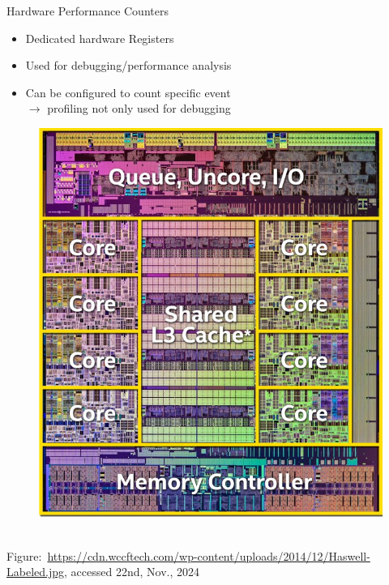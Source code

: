 \documentclass[aspectratio=169]{beamer}
\begin{document}
\begin{frame}{Hardware Performance Counters}
    \begin{minipage}{0.55\textwidth}
        \begin{itemize}
            \item Dedicated hardware Registers
            \item Used for debugging/performance analysis
            \item Can be configured to count specific event
                  \\ $\rightarrow$ profiling not only used for debugging
        \end{itemize}
    \end{minipage}
    \begin{minipage}{0.35\textwidth}
        \begin{figure}
            \includegraphics[width=.7\textwidth]{images/Haswell-Labeled.jpg}
        \end{figure}
    \end{minipage}\\
    \footnotesize{Figure:~\url{https://cdn.wccftech.com/wp-content/uploads/2014/12/Haswell-Labeled.jpg}, accessed 22nd, Nov., 2024}
\end{frame}
\end{document}
